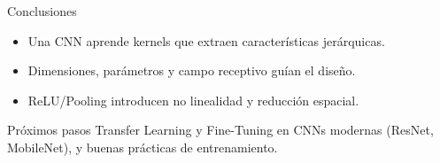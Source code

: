 \documentclass[10pt]{beamer}
\begin{document}
\begin{frame}{Conclusiones}
\begin{itemize}
  \item Una CNN aprende kernels que extraen caracter\'isticas jer\'arquicas.
  \item Dimensiones, par\'ametros y campo receptivo gu\'ian el dise\~no.
  \item ReLU/Pooling introducen no linealidad y reducci\'on espacial.
\end{itemize}
\vspace{2mm}
\begin{block}{Pr\'oximos pasos}
Transfer Learning y Fine-Tuning en CNNs modernas (ResNet, MobileNet), y buenas pr\'acticas de entrenamiento.
\end{block}
\end{frame}
\end{document}
